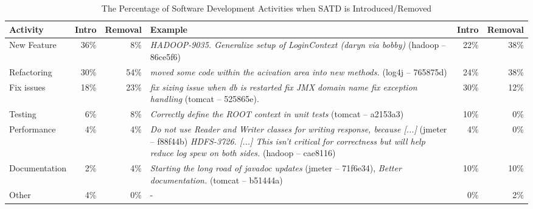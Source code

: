 \begin{table*}[tb]
  \caption{The Percentage of Software Development Activities when SATD is Introduced/Removed}
  \label{tab:percentage_activities} 
  \centering

  \begin{tabular}{l|r|r|p{2.80in}||r|r}
  \hline
       \textbf{Activity} & \textbf{Intro} & \textbf{Removal} & \textbf{Example} & \textbf{Intro} & \textbf{Removal} \\
  \hline
  New Feature &  36\%  &   8\% &  \textit{HADOOP-9035. Generalize setup of LoginContext (daryn via bobby)} (hadoop -- 86ce5f6) & 22\% & 38\% \\
  Refactoring &  30\%  &  54\% &  \textit{moved some code within the acivation area into new methods.} (log4j -- 765875d) &  24\%  &  38\% \\
  Fix issues  &  18\%  &  23\% &  \textit{fix sizing issue when db is restarted fix JMX domain name fix exception handling} (tomcat -- 525865e).  &  30\%  &  12\% \\
  Testing     &   6\%  &   8\% &  \textit{Correctly define the ROOT context in unit tests} (tomcat -- a2153a3)  &  10\%  &  0\% \\
  Performance &   4\%  &   4\% &  \textit{Do not use Reader and Writer classes for writing response, because [...]} (jmeter -- f88f44b) \textit{HDFS-3726. [...] This isn't critical for correctness but will help reduce log spew on both sides.} (hadoop -- cae8116)  &  4\%  &  0\% \\ 
  Documentation & 2\%  &   4\% &  \textit{Starting the long road of javadoc updates} (jmeter -- 71f6e34), \textit{Better documentation.} (tomcat -- b51444a)  &  10\%  &  10\% \\    
  Other\      &   4\%  &   0\% & -  &  0\%  &  2\% \\%
  \hline
  \end{tabular}
\end{table*}